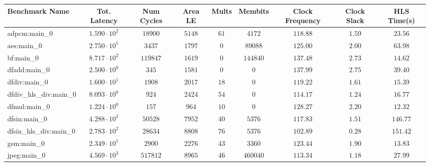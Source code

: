 \begin{tabular}{|l|c|c|c|c|c|c|c|c|}
\hline
Benchmark Name          & Tot. Latency           & Num Cycles & Area LE   & Mults   & Membits    & Clock Frequency & Clock Slack & HLS Time(s) \\
\hline
adpcm:main\_0           & $ 1.590 \cdot 10^{2} $ & $ 18900  $ & $ 5148  $ & $ 61  $ & $ 4172   $ & $ 118.88      $ & $ 1.59    $ & $ 23.56   $ \\
aes:main\_0             & $ 2.750 \cdot 10^{1} $ & $ 3437   $ & $ 1797  $ & $ 0   $ & $ 89088  $ & $ 125.00      $ & $ 2.00    $ & $ 63.98   $ \\
bf:main\_0              & $ 8.717 \cdot 10^{2} $ & $ 119847 $ & $ 1619  $ & $ 0   $ & $ 144840 $ & $ 137.48      $ & $ 2.73    $ & $ 14.62   $ \\
dfadd:main\_0           & $ 2.500 \cdot 10^{0} $ & $ 345    $ & $ 1581  $ & $ 0   $ & $ 0      $ & $ 137.99      $ & $ 2.75    $ & $ 39.40   $ \\
dfdiv:main\_0           & $ 1.600 \cdot 10^{1} $ & $ 1908   $ & $ 2017  $ & $ 18  $ & $ 0      $ & $ 119.22      $ & $ 1.61    $ & $ 15.39   $ \\
dfdiv\_hls\_div:main\_0 & $ 8.093 \cdot 10^{0} $ & $ 924    $ & $ 2424  $ & $ 54  $ & $ 0      $ & $ 114.17      $ & $ 1.24    $ & $ 16.77   $ \\
dfmul:main\_0           & $ 1.224 \cdot 10^{0} $ & $ 157    $ & $ 964   $ & $ 10  $ & $ 0      $ & $ 128.27      $ & $ 2.20    $ & $ 12.32   $ \\
dfsin:main\_0           & $ 4.288 \cdot 10^{2} $ & $ 50528  $ & $ 7952  $ & $ 40  $ & $ 5376   $ & $ 117.83      $ & $ 1.51    $ & $ 146.77  $ \\
dfsin\_hls\_div:main\_0 & $ 2.783 \cdot 10^{2} $ & $ 28634  $ & $ 8808  $ & $ 76  $ & $ 5376   $ & $ 102.89      $ & $ 0.28    $ & $ 151.42  $ \\
gsm:main\_0             & $ 2.349 \cdot 10^{1} $ & $ 2900   $ & $ 2276  $ & $ 43  $ & $ 3360   $ & $ 123.44      $ & $ 1.90    $ & $ 13.83   $ \\
jpeg:main\_0            & $ 4.569 \cdot 10^{3} $ & $ 517812 $ & $ 8965  $ & $ 46  $ & $ 460040 $ & $ 113.34      $ & $ 1.18    $ & $ 27.99   $ \\

\end{tabular}
